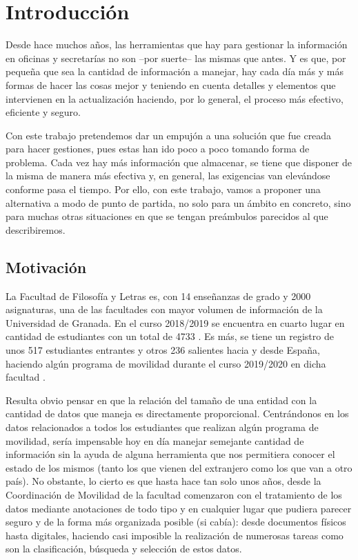 \chapter{Introducción}

Desde hace muchos años, las herramientas que hay para gestionar la información en oficinas y secretarías no son --por suerte-- las mismas que antes. Y es que, por pequeña que sea la cantidad de información a manejar, hay cada día más y más formas de hacer las cosas mejor y teniendo en cuenta detalles y elementos que intervienen en la actualización haciendo, por lo general, el proceso más efectivo, eficiente y seguro.

Con este trabajo pretendemos dar un empujón a una solución que fue creada para hacer gestiones, pues estas han ido poco a poco tomando forma de problema. Cada vez hay más información que almacenar, se tiene que disponer de la misma de manera más efectiva y, en general, las exigencias van elevándose conforme pasa el tiempo. Por ello, con este trabajo, vamos a proponer una alternativa a modo de punto de partida, no solo para un ámbito en concreto, sino para muchas otras situaciones en que se tengan preámbulos parecidos al que describiremos. 

\section{Motivación}

La Facultad de Filosofía y Letras es, con 14 enseñanzas de grado y 2000 asignaturas, una de las facultades con mayor volumen de información de la Universidad de Granada. En el curso 2018/2019 se encuentra en cuarto lugar en cantidad de estudiantes con un total de 4733 \cite{MemAcademica}. Es más, se tiene un registro de unos 517 estudiantes entrantes y otros 236 salientes hacia y desde España, haciendo algún programa de movilidad durante el curso 2019/2020 en dicha facultad \cite{MemFYL}.

Resulta obvio pensar en que la relación del tamaño de una entidad con la cantidad de datos que maneja es directamente proporcional. Centrándonos en los datos relacionados a todos los estudiantes que realizan algún programa de movilidad, sería impensable hoy en día manejar semejante cantidad de información sin la ayuda de alguna herramienta que nos permitiera conocer el estado de los mismos (tanto los que vienen del extranjero como los que van a otro país). No obstante, lo cierto es que hasta hace tan solo unos años, desde la Coordinación de Movilidad de la facultad comenzaron con el tratamiento de los datos mediante anotaciones de todo tipo y en cualquier lugar que pudiera parecer seguro y de la forma más organizada posible (si cabía): desde documentos físicos hasta digitales, haciendo casi imposible la realización de numerosas tareas como son la clasificación, búsqueda y selección de estos datos.


